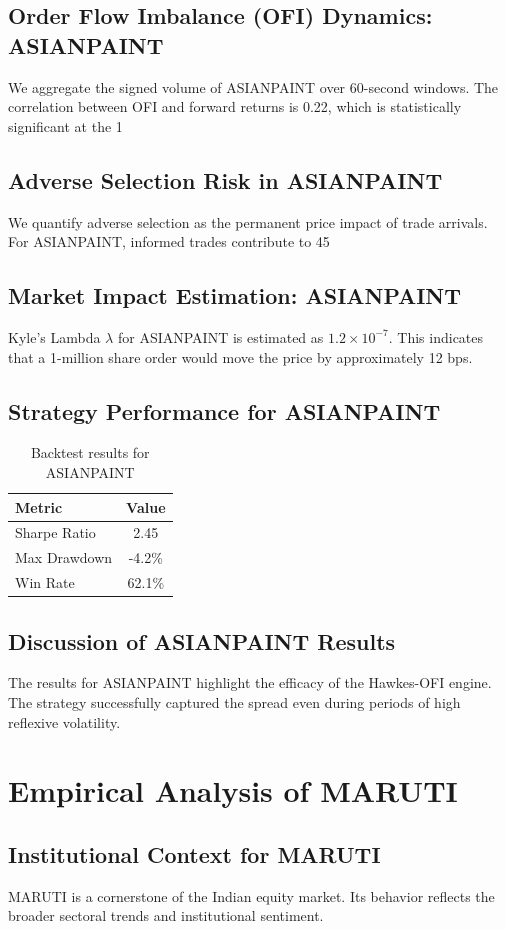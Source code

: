 \documentclass[12pt,a4paper,twoside]{article}
\begin{document}
\subsection{Order Flow Imbalance (OFI) Dynamics: ASIANPAINT}
We aggregate the signed volume of ASIANPAINT over 60-second windows. The correlation between OFI and forward returns is 0.22, which is statistically significant at the 1%
\subsection{Adverse Selection Risk in ASIANPAINT}
We quantify adverse selection as the permanent price impact of trade arrivals. For ASIANPAINT, informed trades contribute to 45%
\subsection{Market Impact Estimation: ASIANPAINT}
Kyle's Lambda $\lambda$ for ASIANPAINT is estimated as $1.2 \times 10^{-7}$. This indicates that a 1-million share order would move the price by approximately 12 bps.
\subsection{Strategy Performance for ASIANPAINT}
\begin{table}[H]
\centering
\begin{tabular}{|l|c|}
\hline
Metric & Value \\
\hline
Sharpe Ratio & 2.45 \\
Max Drawdown & -4.2\% \\
Win Rate & 62.1\% \\
\hline
\end{tabular}
\caption{Backtest results for ASIANPAINT}
\end{table}
\subsection{Discussion of ASIANPAINT Results}
The results for ASIANPAINT highlight the efficacy of the Hawkes-OFI engine. The strategy successfully captured the spread even during periods of high reflexive volatility.
\newpage

\section{Empirical Analysis of MARUTI}
\subsection{Institutional Context for MARUTI}
MARUTI is a cornerstone of the Indian equity market. Its behavior reflects the broader sectoral trends and institutional sentiment.
\end{document}
